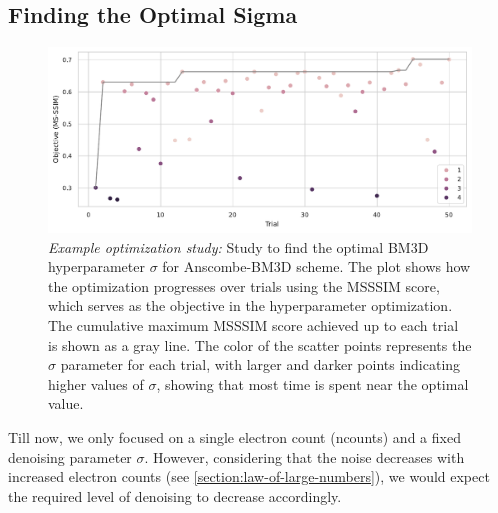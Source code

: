 
\subsection{Finding the Optimal Sigma}\label{section:finding-optimal-sigma}

\begin{figure}
    \centering
    \includegraphics[width=\textwidth]{images/optimization_against_trial.pdf}
    \caption{\textit{Example optimization study:} Study to find the optimal BM3D hyperparameter $\sigma$ for Anscombe-BM3D scheme. The plot shows how the optimization progresses over trials using the \gls{MSSSIM} score, which serves as the objective in the hyperparameter optimization. The cumulative maximum \gls{MSSSIM} score achieved up to each trial is shown as a gray line. The color of the scatter points represents the $\sigma$ parameter for each trial, with larger and darker points indicating higher values of $\sigma$, showing that most time is spent near the optimal value.}
    \label{fig:optimization-against-trial}
\end{figure}


Till now, we only focused on a single electron count (\gls{ncounts}) and a fixed denoising parameter $\sigma$. However, considering that the noise decreases with increased electron counts (see \cref{section:law-of-large-numbers}), we would expect the required level of denoising to decrease accordingly.

